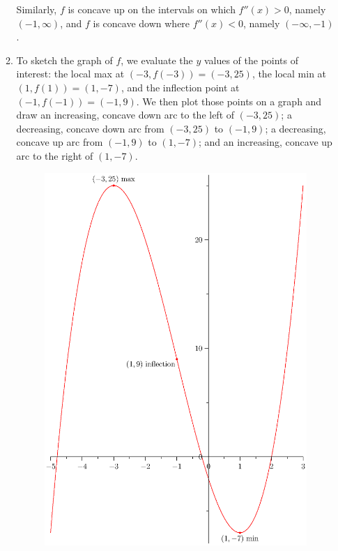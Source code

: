 \documentclass{article}
\begin{document}
\begin{enumerate}
\begin{enumerate}
    Similarly, $f$ is concave up on the intervals on which $f''(x)>0$,
    namely $(-1,\infty)$, and $f$ is concave down where $f''(x)<0$, namely
    $(-\infty,-1)$.
  \item To sketch the graph of $f$, we evaluate the $y$ values of the points
    of interest: the local max at $(-3,f(-3))=(-3,25)$, the local min at
    $(1,f(1))=(1,-7)$, and the inflection point at $(-1,f(-1))=(-1,9)$.
    We then plot those points on a graph and draw an increasing, concave
    down arc to the left of $(-3,25)$; a decreasing, concave down arc from 
    $(-3,25)$ to $(-1,9)$; a decreasing, concave up arc from $(-1,9)$ to
    $(1,-7)$; and an increasing, concave up arc to the right of $(1,-7)$.
    \begin{figure}[htbp]
      \begin{center}
        \includegraphics[width=5.5in]{sketch.eps}
      \end{center}

\end{figure}
\end{enumerate}
\end{enumerate}
\end{document}
